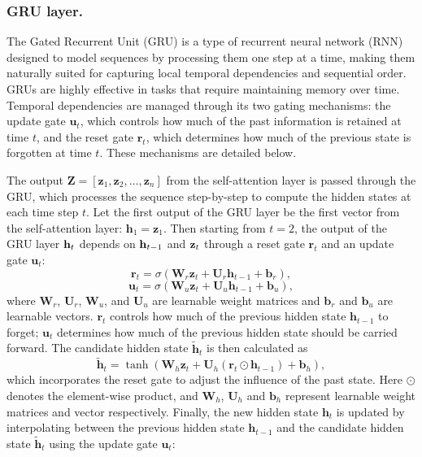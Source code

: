 \subsubsection*{GRU layer.} The Gated Recurrent Unit (GRU) is a type of recurrent neural network (RNN) designed to model sequences by processing them one step at a time, making them naturally suited for capturing local temporal dependencies and sequential order. GRUs are highly effective in tasks that require maintaining memory over time. Temporal dependencies are managed through its two gating mechanisms: the update gate $\mathbf{u}_t$, which controls how much of the past information is retained at time $t$, and the reset gate $\mathbf{r}_t$, which determines how much of the previous state is forgotten at time $t$. These mechanisms are detailed below. 

The output $\mathbf{Z} = [\mathbf{z}_1, \mathbf{z}_2, \dots, \mathbf{z}_n]$ from the self-attention layer is passed through the GRU, which processes the sequence step-by-step to compute the hidden states at each time step $t$. Let the first output of the GRU layer be the first vector from the self-attention layer: $\mathbf{h}_1 = \mathbf{z}_1$. Then starting from $t = 2$, the output of the GRU layer ${\mathbf{h}}_t$ depends on ${\mathbf{h}}_{t-1}$ and ${\mathbf{z}}_t$ through a reset gate $\mathbf{r}_t$ and an update gate $\mathbf{u}_t$:
\begin{equation}
\label{eq:reset_gate}
\mathbf{r}_t = \sigma(\mathbf{W}_r \mathbf{z}_t + \mathbf{U}_r \mathbf{h}_{t-1} + \mathbf{b}_r), 
\end{equation}
\begin{equation}
\label{eq:update_gate}
\mathbf{u}_t = \sigma(\mathbf{W}_u \mathbf{z}_t + \mathbf{U}_u \mathbf{h}_{t-1} + \mathbf{b}_u),
\end{equation}
where $\mathbf{W}_r$, $\mathbf{U}_r$, $\mathbf{W}_u$, and $\mathbf{U}_u$ are learnable weight matrices and $\mathbf{b}_r$ and $\mathbf{b}_u$ are learnable vectors. $\mathbf{r}_t$ controls how much of the previous hidden state \(\mathbf{h}_{t-1}\) to forget; $\mathbf{u}_t$ determines how much of the previous hidden state should be carried forward. The candidate hidden state $\tilde{\mathbf{h}}_t$ is then calculated as 
\begin{equation}
\label{eq:cand_hid_state}
\tilde{\mathbf{h}}_t = \tanh(\mathbf{W}_h \mathbf{z}_t + \mathbf{U}_h (\mathbf{r}_t \odot \mathbf{h}_{t-1}) + \mathbf{b}_h),
\end{equation}
which incorporates the reset gate to adjust the influence of the past state. Here $\odot$ denotes the element-wise product, and $\mathbf{W}_h$, $\mathbf{U}_h$ and $\mathbf{b}_h$ represent learnable weight matrices and vector respectively. Finally, the new hidden state \(\mathbf{h}_t\) is updated by interpolating between the previous hidden state \(\mathbf{h}_{t-1}\) and the candidate hidden state $\tilde{\mathbf{h}}_t$ using the update gate $\mathbf{u}_t$: 

